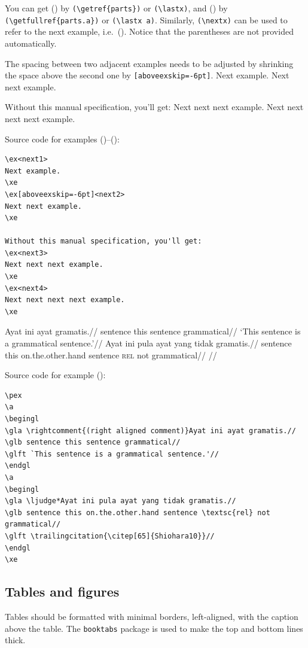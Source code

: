 \documentclass{nusaart}
\begin{document}
You can get () by \verb|(\getref{parts})| or \verb|(\lastx)|, and () by \verb|(\getfullref{parts.a})| or \verb|(\lastx a)|.  Similarly, \verb|(\nextx)| can be used to refer to the next example, i.e.\ (\nextx).  Notice that the parentheses are not provided automatically.

The spacing between two adjacent examples needs to be adjusted by shrinking the space above the second one by \verb|[aboveexskip=-6pt]|.
Next example.
\xe
{}
Next next example.
\xe

Without this manual specification, you'll get: 
Next next next example.
\xe
{}
Next next next next example.
\xe

Source code for examples ()--():
\begin{lstlisting}
\ex<next1>
Next example.
\xe
\ex[aboveexskip=-6pt]<next2>
Next next example.
\xe

Without this manual specification, you'll get: 
\ex<next3>
Next next next example.
\xe
\ex<next4>
Next next next next example.
\xe
\end{lstlisting}

\pex
\a
\begingl
\gla {}Ayat ini ayat gramatis.//
\glb sentence this sentence grammatical//
\glft `This sentence is a grammatical sentence.'//
\endgl
\a
\begingl
\gla \ljudge*Ayat ini pula ayat yang tidak gramatis.//
\glb sentence this on.the.other.hand sentence \textsc{rel} not grammatical//
\glft {}//
\endgl
\xe

Source code for example (\lastx):
\begin{lstlisting}
\pex
\a
\begingl
\gla \rightcomment{(right aligned comment)}Ayat ini ayat gramatis.//
\glb sentence this sentence grammatical//
\glft `This sentence is a grammatical sentence.'//
\endgl
\a
\begingl
\gla \ljudge*Ayat ini pula ayat yang tidak gramatis.//
\glb sentence this on.the.other.hand sentence \textsc{rel} not grammatical//
\glft \trailingcitation{\citep[65]{Shiohara10}}//
\endgl
\xe
\end{lstlisting}

\subsection{Tables and figures}
Tables should be formatted with minimal borders, left-aligned, with the caption above the table.  The \texttt{booktabs} package is used to make the top and bottom lines thick.
\end{document}
